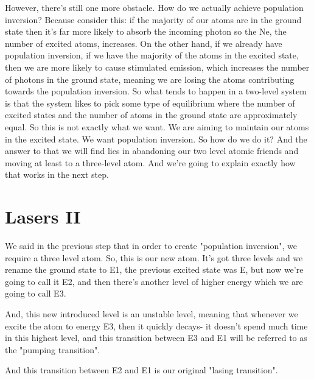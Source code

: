 However, there's still one more obstacle. How do we actually achieve population inversion? Because consider this: if the majority of our atoms are in the ground state then it's far more likely to absorb the incoming photon so the Ne, the number of excited atoms, increases. On the other hand, if we already have population inversion, if we have the majority of the atoms in the excited state, then we are more likely to cause stimulated emission, which increases the number of photons in the ground state, meaning we are losing the atoms contributing towards the population inversion. So what tends to happen in a two-level system is that the system likes to pick some type of equilibrium where the number of excited states and the number of atoms in the ground state are approximately equal. So this is not exactly what we want. We are aiming to maintain our atoms in the excited state. We want population inversion. So how do we do it? And the answer to that we will find lies in abandoning our two level atomic friends and moving at least to a three-level atom. And we're going to explain exactly how that works in the next step.

\section{Lasers II}


We said in the previous step that in order to create "population inversion", we require a three level atom. So, this is our new atom. It's got three levels and we rename the ground state to E1, the previous excited state was E, but now we're going to call it E2, and then there's another level of higher energy which we are going to call E3.

And, this new introduced level is an unstable level, meaning that whenever we excite the atom to energy E3, then it quickly decays- it doesn't spend much time in this highest level, and this transition between E3 and E1 will be referred to as the "pumping transition".

And this transition between E2 and E1 is our original "lasing transition".

